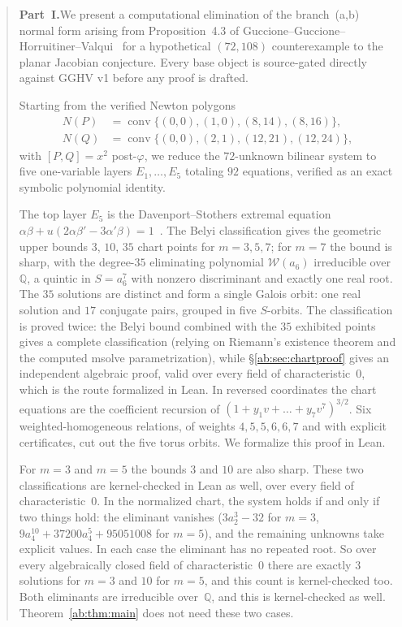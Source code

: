 \documentclass[a4paper,11pt]{article}
\theoremstyle{plain}
\theoremstyle{definition}
\theoremstyle{remark}
\begin{document}
\begin{abstract}
\textbf{Part~I.}\enspace We present a computational elimination of the branch~(a,b) normal form arising from Proposition~4.3 of Guccione--Guccione--Horruitiner--Valqui~\cite{GGHV} for a hypothetical $(72,108)$ counterexample to the planar Jacobian conjecture. Every base object is source-gated directly against GGHV v1 before any proof is drafted.

Starting from the verified Newton polygons
\[
\begin{aligned}
N(P)&=\operatorname{conv}\{(0,0),(1,0),(8,14),(8,16)\},\\
N(Q)&=\operatorname{conv}\{(0,0),(2,1),(12,21),(12,24)\},
\end{aligned}
\]
with $[P,Q]=x^2$ post-$\varphi$, we reduce the $72$-unknown bilinear system to five one-variable layers $E_1,\dots,E_5$ totaling $92$ equations, verified as an exact symbolic polynomial identity.

The top layer $E_5$ is the Davenport--Stothers extremal equation $\alpha\beta+u(2\alpha\beta'-3\alpha'\beta)=1$~\cite{Stothers,Davenport}. The Belyi classification gives the geometric upper bounds $3$, $10$, $35$ chart points for $m=3,5,7$; for $m=7$ the bound is sharp, with the degree-$35$ eliminating polynomial $\mathcal{W}(a_6)$ irreducible over $\mathbb{Q}$, a quintic in $S=a_6^7$ with nonzero discriminant and exactly one real root. The $35$ solutions are distinct and form a single Galois orbit: one real solution and $17$ conjugate pairs, grouped in five $S$-orbits. The classification is proved twice: the Belyi bound combined with the $35$ exhibited points gives a complete classification (relying on Riemann's existence theorem and the computed msolve parametrization), while \S\ref{ab:sec:chartproof} gives an independent algebraic proof, valid over every field of characteristic~$0$, which is the route formalized in Lean. In reversed coordinates the chart equations are the coefficient recursion of $(1+y_1v+\dots+y_7v^7)^{3/2}$. Six weighted-homogeneous relations, of weights $4,5,5,6,6,7$ and with explicit certificates, cut out the five torus orbits. We formalize this proof in Lean.

For $m=3$ and $m=5$ the bounds $3$ and $10$ are also sharp. These two classifications are kernel-checked in Lean as well, over every field of characteristic~$0$. In the normalized chart, the system holds if and only if two things hold: the eliminant vanishes ($3a_2^3-32$ for $m=3$, $9a_4^{10}+37200a_4^5+95051008$ for $m=5$), and the remaining unknowns take explicit values. In each case the eliminant has no repeated root. So over every algebraically closed field of characteristic~$0$ there are exactly $3$ solutions for $m=3$ and $10$ for $m=5$, and this count is kernel-checked too. Both eliminants are irreducible over~$\mathbb{Q}$, and this is kernel-checked as well. Theorem~\ref{ab:thm:main} does not need these two cases.


\end{abstract}
\end{document}
